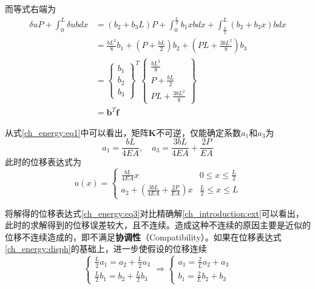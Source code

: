 而等式右端为
\begin{equation}\label{ch_energy:eq2}
\begin{split}
    \delta u P + \int_0^L \delta u b dx &= (b_2+b_3L)P + \int_0^{\frac{L}{2}} b_1 x b dx + \int_{\frac{L}{2}}^L (b_2+b_3 x) b dx \\
                                        &= \frac{bL^2}{8}b_1 + (P+\frac{bL}{2})b_2 + (PL + \frac{3bL^2}{8})b_3 \\
                                        &= \begin{Bmatrix}
                                        b_1 \\ b_2 \\ b_3 
                                        \end{Bmatrix}^T
                                        \begin{Bmatrix}
                                        \frac{bL^2}{8} \\ P+\frac{bL}{2} \\ PL + \frac{3bL^2}{8}
                                        \end{Bmatrix} \\
                                        &= \boldsymbol b^T \boldsymbol f
\end{split}
\end{equation}\par
从式\eqref{ch_energy:eq1}中可以看出，矩阵$\boldsymbol K$不可逆，仅能确定系数$a_1$和$a_3$为
\begin{equation}
a_1 = \frac{bL}{4EA}, \quad a_3 = \frac{3bL}{4EA} + \frac{2P}{EA}
\end{equation}
此时的位移表达式为
\begin{equation}\label{ch_energy:eq3}
u(x) =
\begin{cases}
    \frac{bL}{4EA}x & 0 \le x \le \frac{L}{2} \\
    a_2 + (\frac{3bL}{4EA} + \frac{2P}{EA})x & \frac{L}{2} \le x \le L
\end{cases}
\end{equation}\par
将解得的位移表达式\eqref{ch_energy:eq3}对比精确解\eqref{ch_introduction:ext}可以看出，此时的求解得到的位移误差较大，且不连续。造成这种不连续的原因主要是近似的位移不连续造成的，即不满足\textbf{协调性}（Compatibility）。如果在位移表达式\eqref{ch_energy:disph}的基础上，进一步使假设的位移连续
\begin{equation}\label{ch_energy:coefficient1}
\begin{cases}
    \frac{L}{2}a_1 = a_2 + \frac{L}{2} a_3 \\
    \frac{L}{2}b_1 = b_2 + \frac{L}{2} b_3 
\end{cases} \Rightarrow
\begin{cases}
    a_1 = \frac{2}{L}a_2 + a_3 \\
    b_1 = \frac{2}{L}b_2 + b_3 
\end{cases}
\end{equation}
